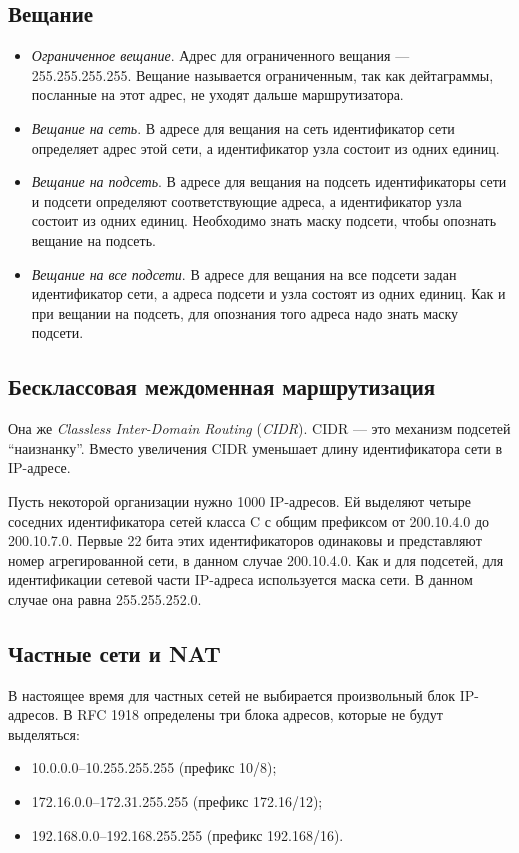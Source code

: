 \subsection{Вещание}
\begin{itemize}
  \item \emph{Ограниченное вещание}. Адрес для ограниченного вещания --- 255.255.255.255. Вещание называется ограниченным, так как дейтаграммы, посланные на этот адрес, не уходят дальше маршрутизатора.
  \item \emph{Вещание на сеть}. В адресе для вещания на сеть идентификатор сети определяет адрес этой сети, а идентификатор узла состоит из одних единиц.
  \item \emph{Вещание на подсеть}. В адресе для вещания на подсеть идентификаторы сети и подсети определяют соответствующие адреса, а идентификатор узла состоит из одних единиц. Необходимо знать маску подсети, чтобы опознать вещание на подсеть.
  \item \emph{Вещание на все подсети}. В адресе для вещания на все подсети задан идентификатор сети, а адреса подсети и узла состоят из одних единиц. Как и при вещании на подсеть, для опознания того адреса надо знать маску подсети.
\end{itemize}

\subsection{Бесклассовая междоменная маршрутизация}
Она же \emph{Classless Inter-Domain Routing} (\emph{CIDR}). CIDR --- это механизм подсетей ``наизнанку''. Вместо увеличения CIDR уменьшает длину идентификатора сети в IP-адресе.

Пусть некоторой организации нужно 1000 IP-адресов. Ей выделяют четыре соседних идентификатора сетей класса C с общим префиксом от 200.10.4.0 до 200.10.7.0. Первые 22 бита этих идентификаторов одинаковы и представляют номер агрегированной сети, в данном случае 200.10.4.0. Как и для подсетей, для идентификации сетевой части IP-адреса используется маска сети. В данном случае она равна 255.255.252.0.

\subsection{Частные сети и NAT}
В настоящее время для частных сетей не выбирается произвольный блок IP-адресов. В RFC 1918 определены три блока адресов, которые не будут выделяться:
\begin{itemize}
  \item 10.0.0.0--10.255.255.255 (префикс 10/8);
  \item 172.16.0.0--172.31.255.255 (префикс 172.16/12);
  \item 192.168.0.0--192.168.255.255 (префикс 192.168/16).
\end{itemize}

